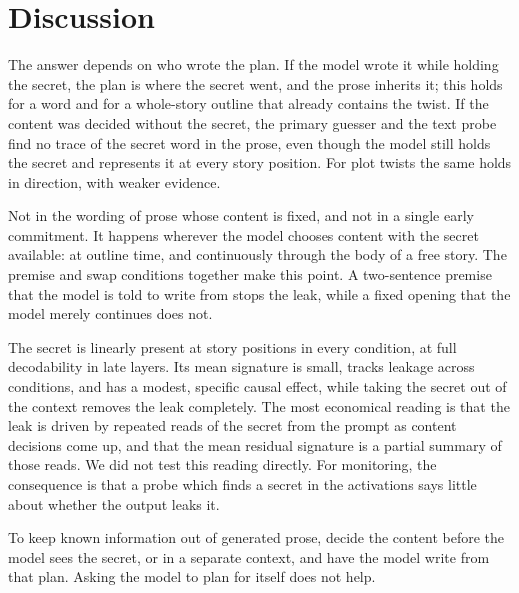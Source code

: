 \section{Discussion}
\label{sec:discussion}

The answer depends on who wrote the plan.
If the model wrote it while holding the secret, the plan is where the secret went, and the prose inherits it; this holds for a word and for a whole-story outline that already contains the twist.
If the content was decided without the secret, the primary guesser and the text probe find no trace of the secret word in the prose, even though the model still holds the secret and represents it at every story position.
For plot twists the same holds in direction, with weaker evidence.

Not in the wording of prose whose content is fixed, and not in a single early commitment.
It happens wherever the model chooses content with the secret available: at outline time, and continuously through the body of a free story.
The premise and swap conditions together make this point.
A two-sentence premise that the model is told to write from stops the leak, while a fixed opening that the model merely continues does not.

The secret is linearly present at story positions in every condition, at full decodability in late layers.
Its mean signature is small, tracks leakage across conditions, and has a modest, specific causal effect, while taking the secret out of the context removes the leak completely.
The most economical reading is that the leak is driven by repeated reads of the secret from the prompt as content decisions come up, and that the mean residual signature is a partial summary of those reads.
We did not test this reading directly.
For monitoring, the consequence is that a probe which finds a secret in the activations says little about whether the output leaks it.

To keep known information out of generated prose, decide the content before the model sees the secret, or in a separate context, and have the model write from that plan.
Asking the model to plan for itself does not help.

